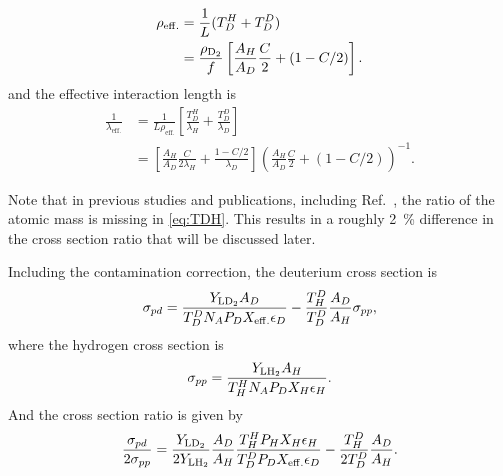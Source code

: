 \documentclass[../main.tex]{subfiles}
\begin{document}
\begin{equation}
	\begin{split}
		\rho_{\mathrm{eff.}} &= \frac{1}{L} (T_D^H + T_D^D)\\
		&=\frac{\rho_{\ce{D_2}}}{f} \left[ \frac{A_H}{A_D}\frac{C}{2}+(1-C/2) \right].
	\end{split}
\end{equation}
and the effective interaction length is
\begin{equation}
	\begin{split}
		\frac{1}{\lambda_{\mathrm{eff.}}} &= \frac{1}{L\rho_{\mathrm{eff.}}} \left[\frac{T_D^H}{\lambda_H} +\frac{T_D^D}{\lambda_D}\right]\\
		&=\left[\frac{A_H}{A_D}\frac{C}{2\lambda_H} + \frac{1-C/2}{\lambda_D}\right]\left( \frac{A_H}{A_D}\frac{C}{2} +(1-C/2)\right)^{-1}.
	\end{split}
\end{equation}

Note that in previous studies and publications, including Ref.~\cite{dove2021,dove2023},
the ratio of the atomic mass is missing in \cref{eq:TDH}.
This results in a roughly \SI{2}{\percent} difference in the cross section ratio
that will be discussed later.

Including the contamination correction, the deuterium cross section is
\begin{equation}
	\sigma_{pd} = \frac{Y_{\ce{LD_2}} A_D}{T_D^D N_A P_D X_{\mathrm{eff.}} \epsilon_D} - \frac{T^D_H}{T_D^D} \frac{A_D}{A_H} \sigma_{pp},
\end{equation}
where the hydrogen cross section is
\begin{equation}
	\sigma_{pp} = \frac{Y_{\ce{LH_2}} A_H}{T_H^H N_A P_D X_{H} \epsilon_H}.
\end{equation}
And the cross section ratio is given by
\begin{equation}
	\frac{\sigma_{pd}}{2\sigma_{pp}} = \frac{Y_{\ce{LD_2}}}{2Y_{\ce{LH_2}}}\frac{A_D}{A_H}\frac{T_H^H P_H X_{H} \epsilon_H}{T_D^D P_D X_{\mathrm{eff.}} \epsilon_D} - \frac{T^D_H}{2T_D^D} \frac{A_D}{A_H}.
\end{equation}
\end{document}
